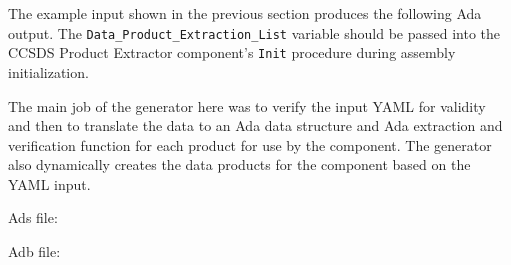 The example input shown in the previous section produces the following Ada output. The
\texttt{Data\_Product\_Extraction\_List} variable should be passed into the CCSDS Product Extractor component's \texttt{Init} procedure during assembly initialization.

The main job of the generator here was to verify the input YAML for validity and then to translate the data to an Ada data structure and Ada extraction and verification function for each product for use by the component. The generator also dynamically creates the data products for the component based on the YAML input.

Ads file:

Adb file:


